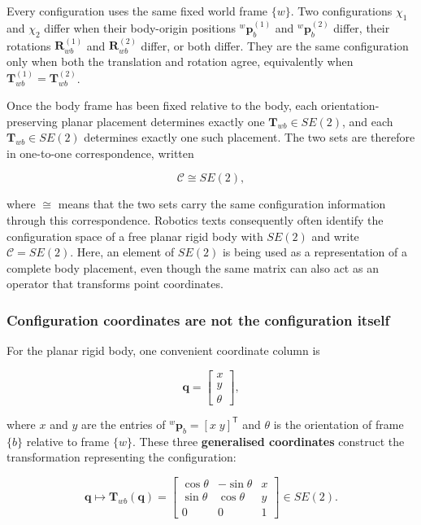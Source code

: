 \documentclass[
  australian,
  12pt,
  letterpaper,
  DIV=11,
  numbers=noendperiod,
  twoside]{scrreprt}
\begin{document}
Every configuration uses the same fixed world frame \(\{w\}\). Two
configurations \(\chi_1\) and \(\chi_2\) differ when their body-origin
positions \({}^{w}\mathbf p_b^{(1)}\) and \({}^{w}\mathbf p_b^{(2)}\)
differ, their rotations \(\mathbf R_{wb}^{(1)}\) and
\(\mathbf R_{wb}^{(2)}\) differ, or both differ. They are the same
configuration only when both the translation and rotation agree,
equivalently when \(\mathbf T_{wb}^{(1)}=\mathbf T_{wb}^{(2)}\).

Once the body frame has been fixed relative to the body, each
orientation-preserving planar placement determines exactly one
\(\mathbf T_{wb}\in SE(2)\), and each \(\mathbf T_{wb}\in SE(2)\)
determines exactly one such placement. The two sets are therefore in
one-to-one correspondence, written

\[
\boxed{
\mathcal C\cong SE(2)
},
\]

where \(\cong\) means that the two sets carry the same configuration
information through this correspondence. Robotics texts consequently
often identify the configuration space of a free planar rigid body with
\(SE(2)\) and write \(\mathcal C=SE(2)\). Here, an element of \(SE(2)\)
is being used as a representation of a complete body placement, even
though the same matrix can also act as an operator that transforms point
coordinates.

\subsubsection{Configuration coordinates are not the configuration
itself}\label{configuration-coordinates-are-not-the-configuration-itself}

For the planar rigid body, one convenient coordinate column is

\[
\mathbf q
=
\begin{bmatrix}
x\\y\\\theta
\end{bmatrix},
\]

where \(x\) and \(y\) are the entries of
\({}^{w}\mathbf p_b=[x\;y]^\mathsf T\) and \(\theta\) is the orientation
of frame \(\{b\}\) relative to frame \(\{w\}\). These three
\textbf{generalised coordinates} construct the transformation
representing the configuration:

\[
\boxed{
\mathbf q
\longmapsto
\mathbf T_{wb}(\mathbf q)
=
\begin{bmatrix}
\cos\theta&-\sin\theta&x\\
\sin\theta&\cos\theta&y\\
0&0&1
\end{bmatrix}
\in SE(2)
}.
\]
\end{document}
